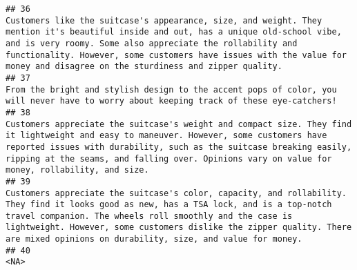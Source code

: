 \documentclass[
]{article}
\begin{document}
\begin{verbatim}
## 36                                                                                                                                                                                                                                                                                           Customers like the suitcase's appearance, size, and weight. They mention it's beautiful inside and out, has a unique old-school vibe, and is very roomy. Some also appreciate the rollability and functionality. However, some customers have issues with the value for money and disagree on the sturdiness and zipper quality.
## 37                                                                                                                                                                                                                                                                                                                                                                                                                                                                                   From the bright and stylish design to the accent pops of color, you will never have to worry about keeping track of these eye-catchers! 
## 38                                                                                                                                                                                                                                                                                                           Customers appreciate the suitcase's weight and compact size. They find it lightweight and easy to maneuver. However, some customers have reported issues with durability, such as the suitcase breaking easily, ripping at the seams, and falling over. Opinions vary on value for money, rollability, and size.
## 39                                                                                                                                                                                                                                                                                    Customers appreciate the suitcase's color, capacity, and rollability. They find it looks good as new, has a TSA lock, and is a top-notch travel companion. The wheels roll smoothly and the case is lightweight. However, some customers dislike the zipper quality. There are mixed opinions on durability, size, and value for money.
## 40                                                                                                                                                                                                                                                                                                                                                                                                                                                                                                                                                                                                                       <NA>

\end{verbatim}
\end{document}
